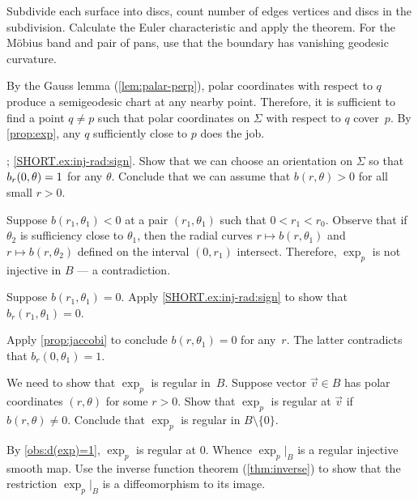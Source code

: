 \begin{multicols}{2}
Subdivide each surface into discs,
count number of edges vertices and discs in the subdivision.
Calculate the Euler characteristic and apply the theorem.
For the Möbius band and pair of pans, use that the boundary has vanishing geodesic curvature.


\setcounter{eqtn}{0}

By the Gauss lemma (\ref{lem:palar-perp}), polar coordinates with respect to $q$ produce a semigeodesic chart at any nearby point.
Therefore, it is sufficient to find a point $q\ne p$ such that polar coordinates on $\Sigma$ with respect to $q$ cover~$p$.
By \ref{prop:exp}, any $q$ sufficiently close to $p$ does the job.

\parbf{\ref{ex:inj-rad}}; \ref{SHORT.ex:inj-rad:sign}.
Show that we can choose an orientation on $\Sigma$ so that $b_r(0,\theta)\z=1$ for any $\theta$.
Conclude that we can assume that $b(r,\theta)>0$ for all small $r>0$.

Suppose $b(r_1,\theta_1)<0$ at a pair $(r_1,\theta_1)$ such that $0<r_1<r_0$.
Observe that if $\theta_2$ is sufficiency close to $\theta_1$, then the radial curves $r\mapsto b(r,\theta_1)$ and $r\mapsto b(r,\theta_2)$ defined on the interval $(0,r_1)$ intersect.
Therefore, $\exp_p$ is not injective in $B$ --- a contradiction.

Suppose $b(r_1,\theta_1)=0$.
Apply \ref{SHORT.ex:inj-rad:sign} to show that $b_r(r_1,\theta_1)=0$.

Apply \ref{prop:jaccobi} to conclude $b(r,\theta_1)=0$ for any~$r$.
The latter contradicts that $b_r(0,\theta_1)=1$.

We need to show that $\exp_p$ is regular in~$B$.
Suppose vector $\vec v\in B$ has polar coordinates $(r,\theta)$ for some $r>0$.
Show that $\exp_p$ is regular at $\vec v$ if $b(r,\theta)\ne 0$.
Conclude that $\exp_p$ is regular in $B\setminus \{0\}$.

By \ref{obs:d(exp)=1}, $\exp_p$ is regular at $0$.
Whence $\exp_p|_B$ is a regular injective smooth map.
Use the inverse function theorem (\ref{thm:inverse}) to show that the restriction $\exp_p|_B$ is a diffeomorphism to its image. 
 




\end{multicols}
